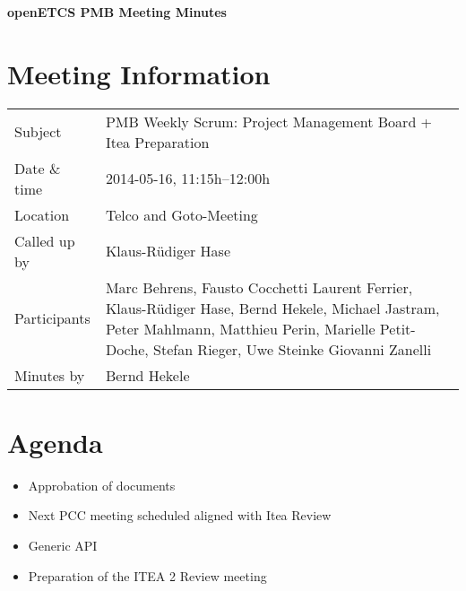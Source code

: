 \documentclass[a4paper, 11pt]{article}
\begin{document}
{\begin{center}\huge\bf openETCS PMB Meeting Minutes\end{center}}
\section{Meeting Information}

\renewcommand{\arraystretch}{1.5}
\begin{supertabular}{m{.2\textwidth}m{.8\textwidth}}
Subject & PMB Weekly Scrum: Project Management Board + Itea Preparation\\
Date \& time & 2014-05-16, 11:15h--12:00h\\
Location & Telco and Goto-Meeting\\
Called up by & Klaus-R\"udiger Hase\\
Participants &
Marc Behrens,
Fausto Cocchetti
Laurent Ferrier,
Klaus-R\"udiger Hase,
Bernd Hekele,
Michael Jastram,
Peter Mahlmann,
Matthieu Perin,
Marielle Petit-Doche,
Stefan Rieger,
Uwe Steinke
Giovanni Zanelli
\\

Minutes by & Bernd Hekele\\

\end{supertabular}
\renewcommand{\arraystretch}{1.0}


\section{{Agenda}}

\begin{itemize}
\item Approbation of documents
\item Next PCC meeting scheduled aligned with Itea Review
\item Generic API
\item Preparation of the ITEA 2 Review meeting
\end{itemize}
\end{document}
